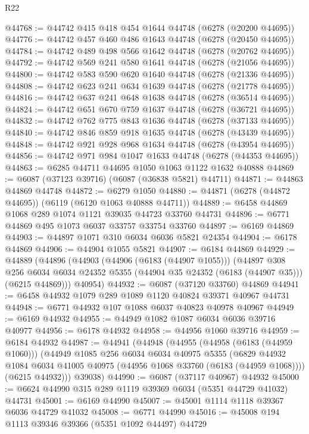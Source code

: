 \begin{lexlean}{R22}
\begin{coremodule}
@44768 := @44742 @415 @418 @454 @1644 @44748 (@6278 (@20200 @44695))
@44776 := @44742 @457 @460 @486 @1643 @44748 (@6278 (@20450 @44695))
@44784 := @44742 @489 @498 @566 @1642 @44748 (@6278 (@20762 @44695))
@44792 := @44742 @569 @241 @580 @1641 @44748 (@6278 (@21056 @44695))
@44800 := @44742 @583 @590 @620 @1640 @44748 (@6278 (@21336 @44695))
@44808 := @44742 @623 @241 @634 @1639 @44748 (@6278 (@21778 @44695))
@44816 := @44742 @637 @241 @648 @1638 @44748 (@6278 (@36514 @44695))
@44824 := @44742 @651 @670 @759 @1637 @44748 (@6278 (@36721 @44695))
@44832 := @44742 @762 @775 @843 @1636 @44748 (@6278 (@37133 @44695))
@44840 := @44742 @846 @859 @918 @1635 @44748 (@6278 (@43439 @44695))
@44848 := @44742 @921 @928 @968 @1634 @44748 (@6278 (@43954 @44695))
@44856 := @44742 @971 @984 @1047 @1633 @44748 (@6278 (@44353 @44695))
@44863 := @6285 @44711 @44695 @1050 @1063 @1122 @1632 @40888
@44869 := @6087 (@37123 @39716) (@6087 (@36838 @5821) @44711)
@44871 := @44863 @44869 @44748
@44872 := @6279 @1050
@44880 := @44871 (@6278 (@44872 @44695)) (@6119 (@6120 @1063 @40888 @44711))
@44889 := @6458 @44869 @1068 @289 @1074 @1121 @39035 @44723 @33760 @44731
@44896 := @6771 @44869 @495 @1073 @6037 @33757 @33754 @33760
@44897 := @6169 @44869
@44903 := @44897 @1071 @310 @6034 @6036 @5821 @24354
@44904 := @6178 @44869
@44906 := @44904 @1055 @5821
@44907 := @6184 @44869
@44929 := @44889
    (@44896
      (@44903
        (@44906 (@6183 (@44907 @1055)))
        (@44897
          @308
          @256
          @6034
          @6034
          @24352
          @5355
          (@44904 @35 @24352 (@6183 (@44907 @35)))
          (@6215 @44869)))
      @40954)
@44932 := @6087 (@37120 @33760) @44869
@44941 := @6458 @44932 @1079 @289 @1089 @1120 @40824 @39371 @40967 @44731
@44948 := @6771 @44932 @107 @1088 @6037 @40823 @40978 @40967
@44949 := @6169 @44932
@44955 := @44949 @1082 @1087 @6034 @6036 @39716 @40977
@44956 := @6178 @44932
@44958 := @44956 @1060 @39716
@44959 := @6184 @44932
@44987 := @44941
    (@44948
      (@44955
        (@44958 (@6183 (@44959 @1060)))
        (@44949
          @1085
          @256
          @6034
          @6034
          @40975
          @5355
          (@6829 @44932 @1084 @6034 @41005 @40975 (@44956 @1068 @33760 (@6183 (@44959 @1068))))
          (@6215 @44932)))
      @39038)
@44990 := @6087 (@37117 @40967) @44932
@45000 := @6624 @44990 @315 @289 @1119 @39369 @6034 (@5351 @44729 @41032) @44731
@45001 := @6169 @44990
@45007 := @45001 @1114 @1118 @39367 @6036 @44729 @41032
@45008 := @6771 @44990
@45016 := @45008 @194 @1113 @39346 @39366 (@5351 @1092 @44497) @44729

\end{coremodule}
\end{lexlean}
